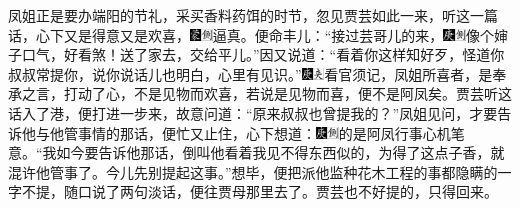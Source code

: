 凤姐正是要办端阳的节礼，采买香料药饵的时节，忽见贾芸如此一来，听这一篇话，心下又是得意又是欢喜，{\includegraphics[width=3mm]{../Images/00006}\includegraphics[width=3mm]{../Images/00011}\footnotesize \kaishu 逼真。}便命丰儿：``接过芸哥儿的来，{\includegraphics[width=3mm]{../Images/00004}\includegraphics[width=3mm]{../Images/00011}\footnotesize \kaishu 像个婶子口气，好看煞！}送了家去，交给平儿。''因又说道：``看着你这样知好歹，怪道你叔叔常提你，说你说话儿也明白，心里有见识。''{\includegraphics[width=3mm]{../Images/00004}\includegraphics[width=3mm]{../Images/00012}\footnotesize \kaishu 看官须记，凤姐所喜者，是奉承之言，打动了心，不是见物而欢喜，若说是见物而喜，便不是阿凤矣。}贾芸听这话入了港，便打进一步来，故意问道：``原来叔叔也曾提我的？''凤姐见问，才要告诉他与他管事情的那话，便忙又止住，心下想道：{\includegraphics[width=3mm]{../Images/00004}\includegraphics[width=3mm]{../Images/00011}\footnotesize \kaishu 的是阿凤行事心机笔意。}``我如今要告诉他那话，倒叫他看着我见不得东西似的，为得了这点子香，就混许他管事了。今儿先别提起这事。''想毕，便把派他监种花木工程的事都隐瞒的一字不提，随口说了两句淡话，便往贾母那里去了。贾芸也不好提的，只得回来。

